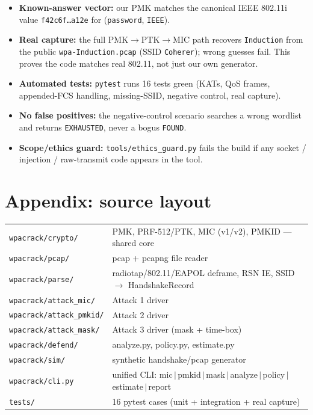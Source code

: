 \documentclass[11pt,a4paper]{article}
\begin{document}
\begin{itemize}
\item \textbf{Known-answer vector:} our PMK matches the canonical IEEE 802.11i value
\texttt{f42c6f\ldots a12e} for (\texttt{password}, \texttt{IEEE}).
\item \textbf{Real capture:} the full PMK$\to$PTK$\to$MIC path recovers \texttt{Induction}
from the public \texttt{wpa-Induction.pcap} (SSID \texttt{Coherer}); wrong guesses fail.
This proves the code matches real 802.11, not just our own generator.
\item \textbf{Automated tests:} \texttt{pytest} runs 16 tests green (KATs, QoS frames,
appended-FCS handling, missing-SSID, negative control, real capture).
\item \textbf{No false positives:} the negative-control scenario searches a wrong wordlist
and returns \texttt{EXHAUSTED}, never a bogus \texttt{FOUND}.
\item \textbf{Scope/ethics guard:} \texttt{tools/ethics\_guard.py} fails the build if any
socket / injection / raw-transmit code appears in the tool.
\end{itemize}

\appendix
\section{Appendix: source layout}

\small
\begin{tabularx}{\textwidth}{@{}l X@{}}
\toprule
\texttt{wpacrack/crypto/} & PMK, PRF-512/PTK, MIC (v1/v2), PMKID --- shared core \\
\texttt{wpacrack/pcap/} & pcap + pcapng file reader \\
\texttt{wpacrack/parse/} & radiotap/802.11/EAPOL deframe, RSN IE, SSID $\to$ HandshakeRecord \\
\texttt{wpacrack/attack\_mic/} & Attack 1 driver \\
\texttt{wpacrack/attack\_pmkid/} & Attack 2 driver \\
\texttt{wpacrack/attack\_mask/} & Attack 3 driver (mask + time-box) \\
\texttt{wpacrack/defend/} & analyze.py, policy.py, estimate.py \\
\texttt{wpacrack/sim/} & synthetic handshake/pcap generator \\
\texttt{wpacrack/cli.py} & unified CLI: mic\,$|$\,pmkid\,$|$\,mask\,$|$\,analyze\,$|$\,policy\,$|$\,estimate\,$|$\,report \\
\texttt{tests/} & 16 pytest cases (unit + integration + real capture) \\
\bottomrule
\end{tabularx}
\normalsize
\end{document}
